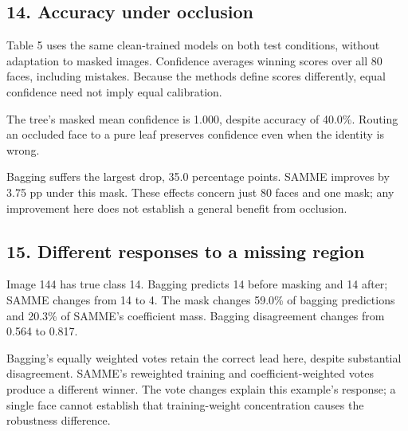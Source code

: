 \documentclass[10pt,twocolumn,letterpaper]{article}
\begin{document}
\subsection*{14. Accuracy under occlusion}
Table 5 uses the same clean-trained models on both test conditions, without adaptation to masked images. Confidence averages winning scores over all 80 faces, including mistakes. Because the methods define scores differently, equal confidence need not imply equal calibration.

The tree's masked mean confidence is 1.000, despite accuracy of 40.0\%. Routing an occluded face to a pure leaf preserves confidence even when the identity is wrong.

Bagging suffers the largest drop, 35.0 percentage points. SAMME improves by 3.75 pp under this mask. These effects concern just 80 faces and one mask; any improvement here does not establish a general benefit from occlusion.

\newpage
\subsection*{15. Different responses to a missing region}
Image 144 has true class 14. Bagging predicts 14 before masking and 14 after; SAMME changes from 14 to 4. The mask changes 59.0\% of bagging predictions and 20.3\% of SAMME's coefficient mass. Bagging disagreement changes from 0.564 to 0.817.

Bagging's equally weighted votes retain the correct lead here, despite substantial disagreement. SAMME's reweighted training and coefficient-weighted votes produce a different winner. The vote changes explain this example's response; a single face cannot establish that training-weight concentration causes the robustness difference.
\end{document}

